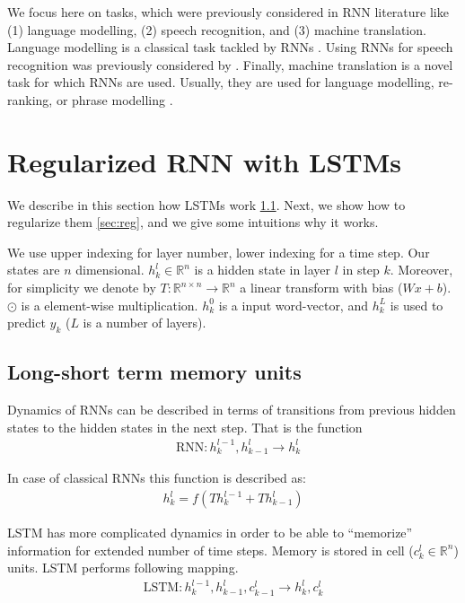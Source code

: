 \documentclass{article}
\begin{document}
We focus here on tasks, which were previously considered in RNN literature like (1)
language modelling, (2) speech recognition, and (3) machine translation. 
Language modelling is a classical task tackled by
RNNs \cite{pascanu2013construct, mikolov2010recurrent, mikolov2011strategies}.
Using RNNs for speech recognition was previously 
considered by \cite{robinson1996use, graves2013speech}. Finally, machine translation
is a novel task for which RNNs are used. Usually, they are used for language modelling, 
re-ranking, or phrase modelling \cite{cho2014learning}.

\section{Regularized RNN with LSTMs}

We describe in this section how LSTMs work \ref{sec:lstm}. Next, 
we show how to regularize them \ref{sec:reg}, and we give some intuitions
why it works.


We use upper indexing for layer number, lower indexing for a time step. 
Our states are $n$ dimensional.
$h^l_k \in \mathbb{R}^{n}$ is a hidden state in layer $l$ in step $k$. Moreover, for simplicity
we denote by $T:\mathbb{R}^{n \times n} \rightarrow \mathbb{R}^{n}$ a 
linear transform with bias ($Wx + b$).
$\odot$ is a element-wise multiplication. $h^0_k$ is a input word-vector, 
and $h^{L}_k$ is used to predict $y_k$ ($L$ is a number of layers).


\subsection{Long-short term memory units}
\label{sec:lstm}

Dynamics of RNNs can be described in terms of transitions
from previous hidden states to the hidden states in the next step. 
That is the function 
\begin{align*}
  &\text{RNN} : h^{l-1}_k, h^l_{k-1} \rightarrow h^l_k
\end{align*}

In case of classical RNNs this function is described as: 
\begin{align*}
  h^l_k = f(Th^{l-1}_k + Th^l_{k-1})
\end{align*}

LSTM has more complicated dynamics in order to be able to 
``memorize'' information for extended number of time steps. 
Memory is stored in cell ($c^l_k \in \mathbb{R}^n$) units. LSTM performs following mapping.
\begin{align*}
\text{LSTM} : h^{l-1}_k, h^l_{k-1}, c^l_{k - 1} \rightarrow h^l_k, c^l_k
\end{align*}
\end{document}
